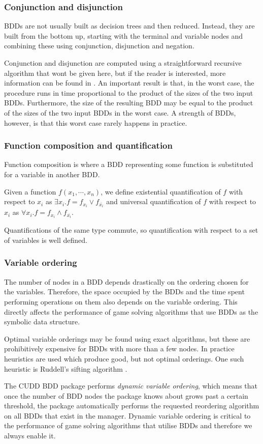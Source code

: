 \subsubsection{Conjunction and disjunction}

BDDs are not usually built as decision trees and then reduced. Instead, they are built from the bottom up, starting with the terminal and variable nodes and combining these using conjunction, disjunction and negation.

Conjunction and disjunction are computed using a straightforward recursive algorithm that wont be given here, but if the reader is interested, more information can be found in \cite{somenzi_bdd}. An important result is that, in the worst case, the procedure runs in time proportional to the product of the sizes of the two input BDDs. Furthermore, the size of the resulting BDD may be equal to the product of the sizes of the two input BDDs in the worst case. A strength of BDDs, however, is that this worst case rarely happens in practice. 

\subsubsection{Function composition and quantification}

Function composition is where a BDD representing some function is substituted for a variable in another BDD.

Given a function $f(x_1,\cdots,x_n)$, we define existential quantification of $f$ with respect to $x_i$ as $\exists x_i. f = f_{x_i} \vee f_{\overline{x_i}}$ and universal quantification of $f$ with respect to $x_i$ as $\forall x_i. f = f_{x_i} \wedge f_{\overline{x_i}}$.

Quantifications of the same type commute, so quantification with respect to a set of variables is well defined. 

\subsubsection{Variable ordering}

The number of nodes in a BDD depends drastically on the ordering chosen for the variables. Therefore, the space occupied by the BDDs and the time spent performing operations on them also depends on the variable ordering. This directly affects the performance of game solving algorithms that use BDDs as the symbolic data structure. 

Optimal variable orderings may be found using exact algorithms, but these are prohibitively expensive for BDDs with more than a few nodes. In practice heuristics are used which produce good, but not optimal orderings. One such heuristic is Ruddell's sifting algorithm \cite{sifting}.

The CUDD BDD package performs \emph{dynamic variable ordering}, which means that once the number of BDD nodes the package knows about grows past a certain threshold, the package automatically performs the requested reordering algorithm on all BDDs that exist in the manager. Dynamic variable ordering is critical to the performance of game solving algorithms that utilise BDDs and therefore we always enable it.

